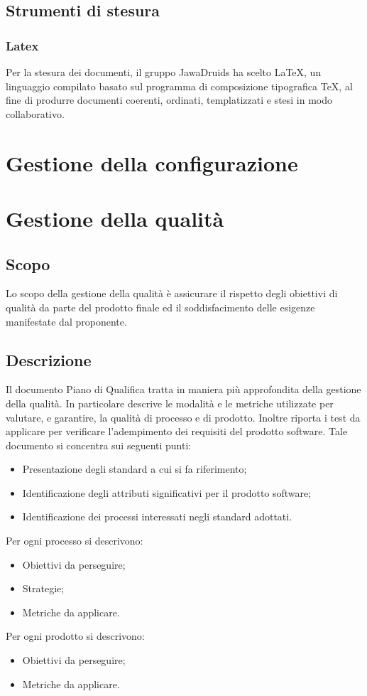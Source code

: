 \subsection{Strumenti di stesura}
\subsubsection{Latex}
Per la stesura dei documenti, il gruppo JawaDruids ha scelto \LaTeX, un linguaggio compilato basato sul programma di composizione tipografica \TeX, al fine di produrre documenti coerenti, ordinati, templatizzati e stesi in modo collaborativo.
\section{Gestione della configurazione}

\section{Gestione della qualità} \label{3.3}
\subsection{Scopo} \label{3.3.1}
Lo scopo della gestione della qualità è assicurare il rispetto degli obiettivi di qualità da parte del prodotto finale ed il soddisfacimento delle esigenze manifestate dal proponente.
\subsection{Descrizione} \label{3.3.2}
Il documento Piano di Qualifica tratta in maniera più approfondita della gestione della qualità. In particolare descrive le modalità e le metriche utilizzate per valutare, e garantire, la qualità di processo e di prodotto. Inoltre riporta i test da applicare per verificare l’adempimento dei requisiti del prodotto software. Tale documento si concentra sui seguenti punti:
\begin{itemize}
	\item Presentazione degli standard a cui si fa riferimento;
	\item Identificazione degli attributi significativi per il prodotto software;
	\item Identificazione dei processi interessati negli standard adottati.
\end{itemize}
Per ogni processo si descrivono:
\begin{itemize}
	\item Obiettivi da perseguire;
	\item Strategie;
	\item Metriche da applicare.
\end{itemize}
Per ogni prodotto si descrivono:
\begin{itemize}
	\item Obiettivi da perseguire;
	\item Metriche da applicare.
\end{itemize}
